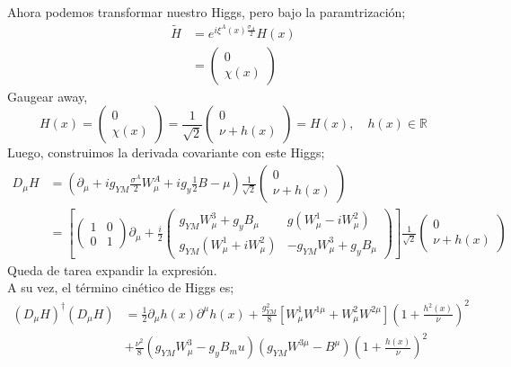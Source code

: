 \documentclass[../main.tex]{subfiles}
\begin{document}
Ahora podemos transformar nuestro Higgs, pero bajo la paramtrización;
\begin{align*}
  \tilde{H}& = e^{i\xi^A(x)\frac{\sigma_A}{2}} H(x) \\
 & = \begin{pmatrix}
   0 \\ \chi(x)
 \end{pmatrix}
\end{align*}
Gaugear away, 
\begin{equation}
  H(x) = \begin{pmatrix}
    0 \\ \chi(x)
  \end{pmatrix}
  = \frac{1}{\sqrt{2}}\begin{pmatrix}
    0 \\ \nu + h(x)
  \end{pmatrix}
  = H(x),\quad h(x)\in \mathbb{R}
 \end{equation}
 Luego, construimos la derivada covariante con este Higgs;
 \begin{align*}
   D_\mu H & = \left( \partial_\mu  + ig_{YM} \frac{\sigma^A}{2} W^A_{\mu} + i g_y \frac{1}{2}B-\mu \right)  \frac{1}{\sqrt{2}} \begin{pmatrix}
     0 \\ \nu + h(x)
   \end{pmatrix} \\
   & = \left[ \begin{pmatrix}
    1 & 0 \\ 0 & 1
   \end{pmatrix}\partial_\mu + \frac{i}{2} \begin{pmatrix}
     g_{YM} W^3_\mu + g_y B_\mu & g \left( W^1_\mu -i W^2_\mu \right) \\ g_{YM} \left( W^1_\mu + i W^2_\mu  \right) & - g_{YM} W^3_\mu + g_y B_\mu
   \end{pmatrix} \right] \frac{1}{\sqrt{2}} \begin{pmatrix}
     0 \\ \nu + h(x)
   \end{pmatrix}
 \end{align*}
 Queda de tarea expandir la expresión. \\
A su vez, el término cinético de Higgs es;
\begin{align*}
  \left( D_\mu H \right)^\dagger \left( D_\mu H \right) & = \frac{1}{2}\partial_\mu h(x) \partial^\mu h(x) + \frac{g_{YM}^2}{8} \left[ W^1_\mu W^{1\mu} + W^2_\mu W^{2\mu} \right] \left( 1 + \frac{h^2(x)}{\nu} \right)^2 \\ & + \frac{\nu^2}{8} \left( g_{YM}W^3_\mu - g_yB_mu  \right) \left( g_{YM} W^{3\mu} - B^\mu \right) \left( 1 + \frac{h(x)}{\nu} \right)^2
\end{align*}
\end{document}
